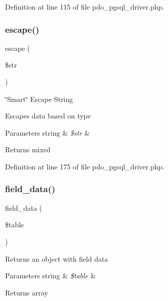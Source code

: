 Definition at line 115 of file pdo\+\_\+pgsql\+\_\+driver.\+php.

\mbox{\label{class_c_i___d_b__pdo__pgsql__driver_ac8f37ca5703d4558c732e692194f8cd6}} 
\subsubsection{\texorpdfstring{escape()}{escape()}}
{\footnotesize\ttfamily escape (\begin{DoxyParamCaption}\item[{}]{\$str }\end{DoxyParamCaption})}

\char`\"{}\+Smart\char`\"{} Escape String

Escapes data based on type


\begin{DoxyParams}[1]{Parameters}
string & {\em \$str} & \\
\hline
\end{DoxyParams}
\begin{DoxyReturn}{Returns}
mixed 
\end{DoxyReturn}


Definition at line 175 of file pdo\+\_\+pgsql\+\_\+driver.\+php.

\mbox{\label{class_c_i___d_b__pdo__pgsql__driver_a90355121e1ed009e0efdbd544ab56efa}} 
\subsubsection{\texorpdfstring{field\_data()}{field\_data()}}
{\footnotesize\ttfamily field\+\_\+data (\begin{DoxyParamCaption}\item[{}]{\$table }\end{DoxyParamCaption})}

Returns an object with field data


\begin{DoxyParams}[1]{Parameters}
string & {\em \$table} & \\
\hline
\end{DoxyParams}
\begin{DoxyReturn}{Returns}
array 
\end{DoxyReturn}


